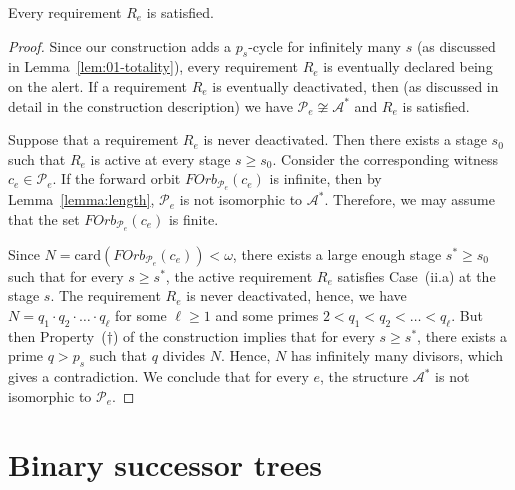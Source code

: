 \documentclass[a4paper,UKenglish,cleveref, autoref, thm-restate]{lipics-v2021}
\begin{document}
\begin{lemma}\label{lem:02-reqs-satisfied}
	Every requirement $R_e$ is satisfied.
\end{lemma}
\begin{proof}
	Since our construction adds a $p_s$-cycle for infinitely many $s$ (as discussed in Lemma~\ref{lem:01-totality}), every requirement $R_e$ is eventually declared being on the alert. If a requirement $R_e$ is eventually deactivated, then (as discussed in detail in the construction description) we have $\mathcal{P}_e \not\cong \mathcal{A}^{\ast}$ and $R_e$ is satisfied.
	
	Suppose that a requirement $R_e$ is never deactivated. Then there exists a stage $s_0$ such that $R_e$ is active at every stage $s \geq s_0$. Consider the corresponding witness $c_e\in\mathcal{P}_e$. 	
	If the forward orbit $FOrb_{\mathcal{P}_e}(c_e)$ is infinite, then by Lemma~\ref{lemma:length}, $\mathcal{P}_e$ is not isomorphic to $\mathcal{A}^{\ast}$. Therefore, we may assume that the set $FOrb_{\mathcal{P}_e}(c_e)$ is finite. 
	
	Since $N = \mathrm{card}(FOrb_{\mathcal{P}_e}(c_e)) <\omega$, there exists a large enough stage $s^{\ast} \geq s_0$ such that for every $s\geq s^{\ast}$, the active requirement $R_e$ satisfies Case~(ii.a) at the stage $s$. The requirement $R_e$ is never deactivated, hence, we have
	$
		N = q_1 \cdot q_2 \cdot \ldots \cdot q_{\ell}
	$
	for some $\ell \geq 1$ and some primes $2 < q_1 < q_2 <\dots < q_{\ell}$. But then Property~($\dagger$) of the construction implies that for every $s \geq s^{\ast}$, there exists a prime $q > p_s$ such that $q$ divides $N$. Hence, $N$ has infinitely many divisors, which gives a contradiction.	We conclude that for every $e$, the structure $\mathcal{A}^{\ast}$ is not isomorphic to $\mathcal{P}_e$.
\end{proof}









\appendix


\section{Binary successor trees}\label{app:succ-trees}
\end{document}
